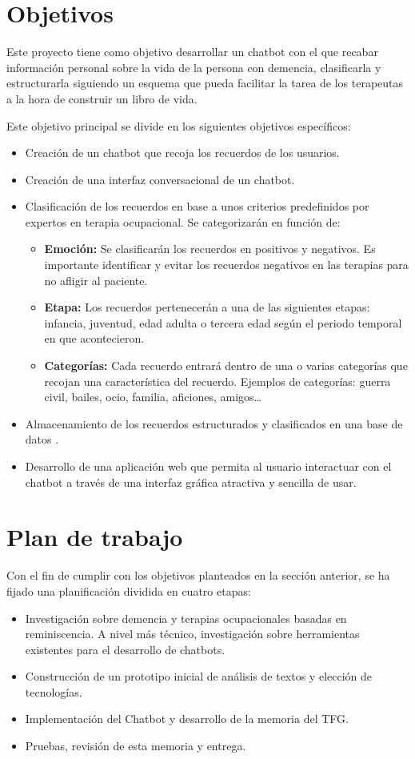 \section{Objetivos}

Este proyecto tiene como objetivo desarrollar un chatbot con el que recabar información personal sobre la vida de la persona con demencia, clasificarla y estructurarla siguiendo un esquema que pueda facilitar la tarea de los terapeutas a la hora de construir un libro de vida. 

Este objetivo principal se divide en los siguientes objetivos específicos:
\begin{itemize}
	\item Creación de un chatbot que recoja los recuerdos de los usuarios.
	\item Creación de una interfaz conversacional de un chatbot.
	\item Clasificación de los recuerdos en base a unos criterios predefinidos por expertos en terapia ocupacional. Se categorizarán en función de: 
	\begin{itemize}
		\item \textbf{Emoción:} Se clasificarán los recuerdos en positivos y negativos. Es importante identificar y evitar los recuerdos negativos en las terapias para no afligir al paciente. 
		\item \textbf{Etapa:} Los recuerdos pertenecerán a una de las siguientes etapas: infancia, juventud, edad adulta o tercera edad según el periodo temporal en que acontecieron.
		\item \textbf{Categorías:} Cada recuerdo entrará dentro de una o varias categorías que recojan una característica del recuerdo. Ejemplos de categorías: guerra civil, bailes, ocio, familia, aficiones, amigos…
	\end{itemize}
	\item Almacenamiento de los recuerdos estructurados y clasificados en una base de datos .
	\item Desarrollo de una aplicación web que permita al usuario interactuar con el chatbot a través de una interfaz gráfica atractiva y sencilla de usar.
\end{itemize}


\section{Plan de trabajo}

Con el fin de cumplir con los objetivos planteados en la sección anterior, se ha fijado una planificación dividida en cuatro etapas:
\begin{itemize}
	\item Investigación sobre demencia y terapias ocupacionales basadas en reminiscencia. A nivel más técnico, investigación sobre herramientas existentes para el desarrollo de chatbots.
	\item Construcción de un prototipo inicial de análisis de textos y elección de tecnologías.
	\item Implementación del Chatbot y desarrollo de la memoria del TFG.
	\item Pruebas, revisión de esta memoria y entrega.
\end{itemize}

